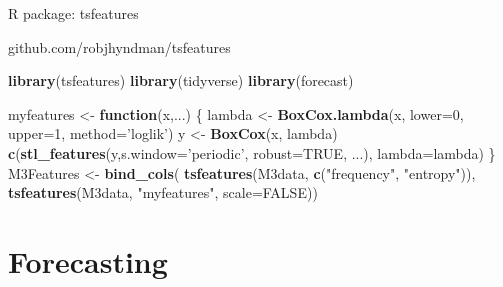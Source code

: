 \documentclass[14pt,ignorenonframetext,]{beamer}
\newenvironment{Shaded}{\begin{snugshade}}{\end{snugshade}}
\newcommand{\ControlFlowTok}[1]{\textcolor[rgb]{0.13,0.29,0.53}{\textbf{#1}}}
\newcommand{\DataTypeTok}[1]{\textcolor[rgb]{0.13,0.29,0.53}{#1}}
\newcommand{\DecValTok}[1]{\textcolor[rgb]{0.00,0.00,0.81}{#1}}
\newcommand{\KeywordTok}[1]{\textcolor[rgb]{0.13,0.29,0.53}{\textbf{#1}}}
\newcommand{\NormalTok}[1]{#1}
\newcommand{\OtherTok}[1]{\textcolor[rgb]{0.56,0.35,0.01}{#1}}
\newcommand{\StringTok}[1]{\textcolor[rgb]{0.31,0.60,0.02}{#1}}
\renewenvironment{Shaded}{\color{black}\begin{snugshade}\color{black}}{\end{snugshade}}
\begin{document}
\begin{frame}[fragile]{R package: tsfeatures}
\protect\hypertarget{r-package-tsfeatures}{}

\alert{github.com/robjhyndman/tsfeatures}\fontsize{9.5}{11}\sf

\begin{Shaded}
\begin{Highlighting}[]
\KeywordTok{library}\NormalTok{(tsfeatures)}
\KeywordTok{library}\NormalTok{(tidyverse)}
\KeywordTok{library}\NormalTok{(forecast)}

\NormalTok{myfeatures <-}\StringTok{ }\ControlFlowTok{function}\NormalTok{(x,...) \{}
\NormalTok{  lambda <-}\StringTok{ }\KeywordTok{BoxCox.lambda}\NormalTok{(x, }\DataTypeTok{lower=}\DecValTok{0}\NormalTok{, }\DataTypeTok{upper=}\DecValTok{1}\NormalTok{, }\DataTypeTok{method=}\StringTok{'loglik'}\NormalTok{)}
\NormalTok{  y <-}\StringTok{ }\KeywordTok{BoxCox}\NormalTok{(x, lambda)}
  \KeywordTok{c}\NormalTok{(}\KeywordTok{stl_features}\NormalTok{(y,}\DataTypeTok{s.window=}\StringTok{'periodic'}\NormalTok{, }\DataTypeTok{robust=}\OtherTok{TRUE}\NormalTok{, ...),}
    \DataTypeTok{lambda=}\NormalTok{lambda)}
\NormalTok{\}}
\NormalTok{M3Features <-}\StringTok{ }\KeywordTok{bind_cols}\NormalTok{(}
  \KeywordTok{tsfeatures}\NormalTok{(M3data, }\KeywordTok{c}\NormalTok{(}\StringTok{"frequency"}\NormalTok{, }\StringTok{"entropy"}\NormalTok{)),}
  \KeywordTok{tsfeatures}\NormalTok{(M3data, }\StringTok{"myfeatures"}\NormalTok{, }\DataTypeTok{scale=}\OtherTok{FALSE}\NormalTok{))}
\end{Highlighting}
\end{Shaded}

\end{frame}

\hypertarget{forecasting}{%
\section{Forecasting}\label{forecasting}}
\end{document}
